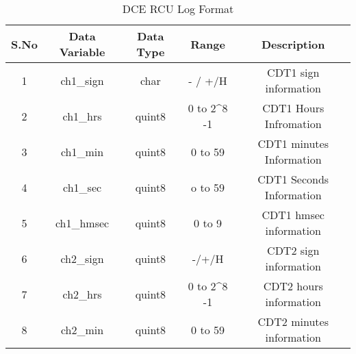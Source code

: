 \begin{landscape}
	\begin{longtable}[c]{|c|c|c|c|c|}
		\caption{DCE RCU Log Format}
		\label{Table:DCERCULog}\\
		\hline
		\textbf{S.No} & \textbf{Data Variable} & \textbf{Data Type} & \textbf{Range}                                                                                                    & \textbf{Description}     \\ \hline
		\endfirsthead
		\endhead
		1             & ch1\_sign              & char               & - / +/H                                                                                                           & CDT1 sign information    \\ \hline
		2             & ch1\_hrs               & quint8             & 0 to 2\textasciicircum 8 -1                                                                                       & CDT1 Hours Infromation   \\ \hline
		3             & ch1\_min               & quint8             & 0 to 59                                                                                                           & CDT1 minutes Information \\ \hline
		4             & ch1\_sec               & quint8             & o to 59                                                                                                           & CDT1 Seconds Information \\ \hline
		5             & ch1\_hmsec             & quint8             & 0 to 9                                                                                                            & CDT1 hmsec information   \\ \hline
		6             & ch2\_sign              & quint8             & -/+/H                                                                                                             & CDT2 sign information    \\ \hline
		7             & ch2\_hrs               & quint8             & 0 to 2\textasciicircum 8 -1                                                                                       & CDT2 hours information   \\ \hline
		8             & ch2\_min               & quint8             & 0 to 59                                                                                                           & CDT2 minutes information \\ \hline

\end{longtable}
\end{landscape}
